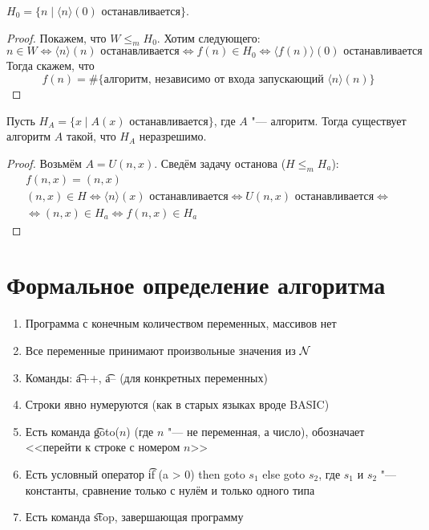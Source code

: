 \begin{exmp}
	$H_0 = \{n \mid \langle n \rangle(0)\text{~останавливается} \}$.
\end{exmp}
\begin{proof}
	Покажем, что $W \le_m H_0$.
	Хотим следующего:
	\[ n \in W \iff \langle n \rangle(n)\text{~останавливается} \iff f(n) \in H_0 \iff \langle f(n) \rangle (0)\text{~останавливается} \]
	Тогда скажем, что
	\[ f(n) = \#\{\text{алгоритм, независимо от входа запускающий~}\langle n \rangle(n) \} \]
\end{proof}

\begin{exmp}
	Пусть $H_A = \{x \mid A(x)\text{~останавливается}\}$, где $A$ "--- алгоритм.
	Тогда существует алгоритм $A$ такой, что $H_A$ неразрешимо.
\end{exmp}
\begin{proof}
	Возьмём $A = U(n, x)$.
	Сведём задачу останова ($H \le_m H_a$):
	\begin{gather*}
		f(n, x) = (n, x) \\
		(n, x) \in H \iff \langle n \rangle (x)\text{~останавливается}\iff U(n, x)\text{~останавливается} \iff \\
		\iff (n, x) \in H_a \iff f(n, x) \in H_a
	\end{gather*}
\end{proof}

\section{Формальное определение алгоритма}
\begin{enumerate}
	\item Программа с конечным количеством переменных, массивов нет
	\item Все переменные принимают произвольные значения из $\mathcal{N}$
	\item Команды: \t{a++}, \t{a--} (для конкретных переменных)
	\item Строки явно нумеруются (как в старых языках вроде BASIC)
	\item Есть команда \t{goto($n$)} (где $n$ "--- не переменная, а число), обозначает <<перейти к строке с номером $n$>>
	\item Есть условный оператор \t{if (a > 0) then goto $s_1$ else goto $s_2$}, где $s_1$ и $s_2$ "--- константы, сравнение только с нулём и только одного типа
	\item Есть команда \t{stop}, завершающая программу
\end{enumerate}


